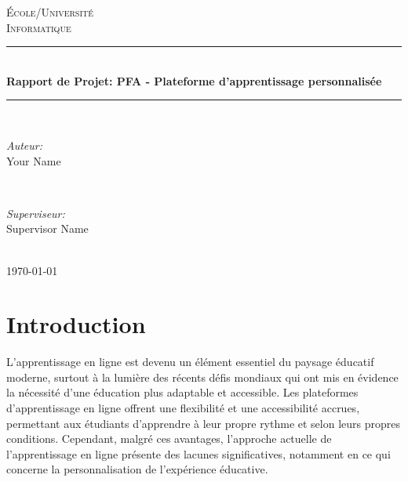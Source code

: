 




\pagestyle{fancy}
\fancyhf{}

\begin{titlepage}
\newcommand{\HRule}{\rule{\linewidth}{0.5mm}}
\centering
\vfill
\textsc{\LARGE École/Université}\\[0.5cm]  
\textsc{\Large Informatique}\\[0.5cm]  %
\HRule \\[0.4cm]
{ \huge \bfseries Rapport de Projet: PFA - Plateforme d'apprentissage personnalisée}
\HRule \\[1.5cm]

\begin{minipage}{0.4\textwidth}
\begin{flushleft} \large
\emph{Auteur:}\\
Your Name
\end{flushleft}
\end{minipage}
~
\begin{minipage}{0.4\textwidth}
\begin{flushright} \large
\emph{Superviseur:} \\
Supervisor Name
\end{flushright}
\end{minipage}\\[2cm]

{\large \today}\\[2cm] 
\nopagebreak
\end{titlepage}

\tableofcontents
\newpage


\part{Introduction}

L'apprentissage en ligne est devenu un élément essentiel du paysage éducatif moderne, surtout à la lumière des récents défis mondiaux qui ont mis en évidence la nécessité d'une éducation plus adaptable et accessible. Les plateformes d'apprentissage en ligne offrent une flexibilité et une accessibilité accrues, permettant aux étudiants d'apprendre à leur propre rythme et selon leurs propres conditions. Cependant, malgré ces avantages, l'approche actuelle de l'apprentissage en ligne présente des lacunes significatives, notamment en ce qui concerne la personnalisation de l'expérience éducative.

